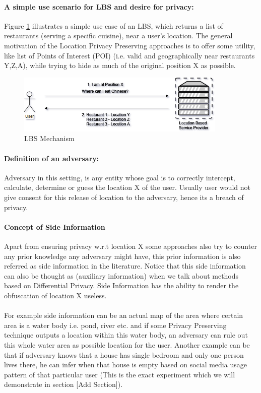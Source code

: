 \documentclass{report}
\begin{document}
\paragraph{A simple use scenario for LBS and desire for privacy:}

Figure \ref{fig:LBSMechanism} illustrates a simple use case of an LBS, which returns a list of restaurants (serving a specific cuisine), near a user's location. The general motivation of the Location Privacy Preserving approaches is to offer some utility, like list of Points of Interest (POI) (i.e. valid and geographically near restaurants Y,Z,A), while trying to hide as much of the original position X as possible.
\begin{figure}[ht]
\centering
        \includegraphics[width=100mm,scale=0.5]{Images/LBS-Scenario.png}
    \caption{LBS Mechanism}
    \label{fig:LBSMechanism}
\end{figure}

\paragraph{Definition of an adversary:}
Adversary in this setting, is any entity whose goal is to correctly intercept, calculate, determine or guess the location X of the user. Usually user would not give consent for this release of location to the adversary, hence its a breach of privacy.

\paragraph{Concept of Side Information}
Apart from ensuring privacy w.r.t location X some approaches also try to counter any prior knowledge any adversary might have, this prior information is also referred as side information in the literature. Notice that this side information can also be thought as (auxiliary information) when we talk about methods based on Differential Privacy. Side Information has the ability to render the obfuscation of location X useless. 


\paragraph{}
For example side information can be an actual map of the area where certain area is a water body i.e. pond, river etc. and if some Privacy Preserving technique outputs a location within this water body, an adversary can rule out this whole water area as possible location for the user. Another example can be that if adversary knows that a house has single bedroom and only one person lives there, he can infer when that house is empty based on social media usage pattern of that particular user (This is the exact experiment which we will demonstrate in section [Add Section]).
\end{document}
